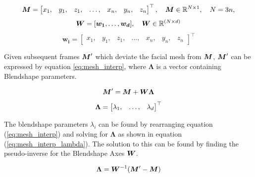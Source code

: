\begin{equation*}
    {\boldsymbol{{M}}} = \begin{bmatrix} 
                x_{1}, &
                y_{1}, &
                z_{1}, &
                \dots, &
                x_{n}, &
                y_{n}, &
                z_{n}
               \end{bmatrix}^\top,
    \quad
    {\boldsymbol{{M}}} \in \mathbb{R}^{N\times 1},
    \quad
    N = 3n,
\end{equation*}
\quad
\begin{equation*}
    {\boldsymbol{{W}}} = [
               {\boldsymbol{{w_1}}}, \dots, {\boldsymbol{{w_d}}}
              ],
    \quad
    {\boldsymbol{{W}}} \in \mathbb{R}^{(N \times d)}
\end{equation*}
\quad
\begin{equation*}
    \bm{w_i} = \begin{bmatrix} 
                x_{1}, &
                y_{1}, &
                z_{1}, &
                \dots, &
                x_{n}, &
                y_{n}, &
                z_{n}
    \end{bmatrix}^\top
\end{equation*}

Given subsequent frames ${\boldsymbol{{M}}}^{\prime}$ which deviate the facial mesh from ${\boldsymbol{{M}}}$, ${\boldsymbol{{M}}}^{\prime}$ can be expressed by equation \ref{eq:mesh_interp}, where $\bm{\Lambda}$ is a vector containing Blendshape parameters.

\begin{equation}\label{eq:mesh_interp}
    {\boldsymbol{{M}}}^{\prime} = {\boldsymbol{{M}}} + {\boldsymbol{{W}}} {\boldsymbol{{\Lambda}}}
\end{equation}
\quad
\begin{equation*}
    {\boldsymbol{{\Lambda}}} = \begin{bmatrix}
        \lambda_1, &
        \dots, &
        \lambda_d
    \end{bmatrix}^\top
\end{equation*}

The blendshape parameters $\lambda_i$ can be found by rearranging equation (\ref{eq:mesh_interp}) and solving for $\bm{\Lambda}$ as shown in equation (\ref{eq:mesh_interp_lambda}).
The solution to this can be found by finding the pseudo-inverse for the Blendshape Axes ${\boldsymbol{{W}}}$.

\begin{equation}\label{eq:mesh_interp_lambda}
    {\boldsymbol{{\Lambda}}} = {\boldsymbol{{W}}}^{-1}({\boldsymbol{{M}}}^{\prime} - {\boldsymbol{{M}}})
\end{equation}

